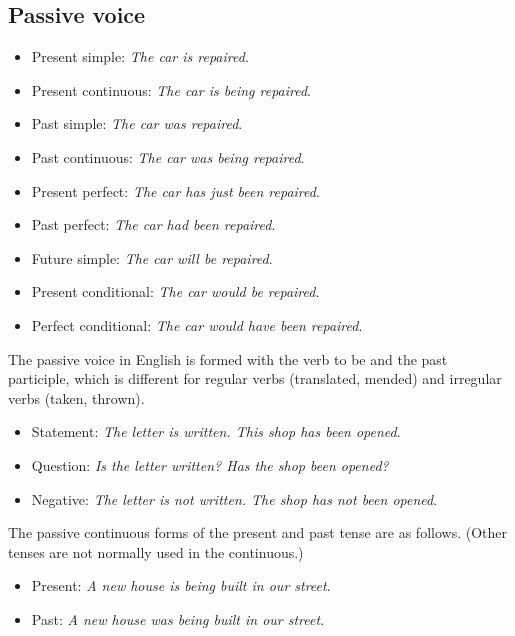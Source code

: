 \subsection{Passive voice}

\begin{itemize}

\item Present simple: \textit{The car is repaired}.
\item Present continuous: \textit{The car is being repaired}.
\item Past simple: \textit{The car was repaired}.
\item Past continuous: \textit{The car was being repaired}.
\item Present perfect: \textit{The car has just been repaired}.
\item Past perfect: \textit{The car had been repaired}.
\item Future simple: \textit{The car will be repaired}.
\item Present conditional: \textit{The car would be repaired}.
\item Perfect conditional: \textit{The car would have been repaired}.

\end{itemize}

The passive voice in English is formed with the verb to be and the past participle, which is different for regular verbs (translated, mended) and irregular verbs (taken, thrown).

\begin{itemize}

\item Statement: \textit{The letter is written. This shop has been opened}.
\item Question: \textit{Is the letter written? Has the shop been opened?}
\item Negative: \textit{The letter is not written. The shop has not been opened}.
\end{itemize}

The passive continuous forms of the present and past tense are as follows. (Other tenses are not normally used in the continuous.)

\begin{itemize}

\item Present: \textit{ A new house is being built in our street}.
\item Past: \textit{A new house was being built in our street}.
\end{itemize}

